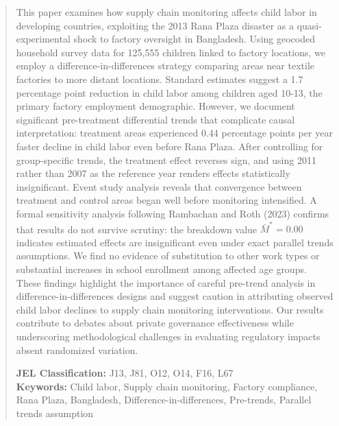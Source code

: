 
\begin{abstract}
\noindent This paper examines how supply chain monitoring affects child labor in developing countries, exploiting the 2013 Rana Plaza disaster as a quasi-experimental shock to factory oversight in Bangladesh. Using geocoded household survey data for 125,555 children linked to factory locations, we employ a difference-in-differences strategy comparing areas near textile factories to more distant locations. Standard estimates suggest a 1.7 percentage point reduction in child labor among children aged 10-13, the primary factory employment demographic. However, we document significant pre-treatment differential trends that complicate causal interpretation: treatment areas experienced 0.44 percentage points per year faster decline in child labor even before Rana Plaza. After controlling for group-specific trends, the treatment effect reverses sign, and using 2011 rather than 2007 as the reference year renders effects statistically insignificant. Event study analysis reveals that convergence between treatment and control areas began well before monitoring intensified. A formal sensitivity analysis following Rambachan and Roth (2023) confirms that results do not survive scrutiny: the breakdown value $\bar{M}^* = 0.00$ indicates estimated effects are insignificant even under exact parallel trends assumptions. We find no evidence of substitution to other work types or substantial increases in school enrollment among affected age groups. These findings highlight the importance of careful pre-trend analysis in difference-in-differences designs and suggest caution in attributing observed child labor declines to supply chain monitoring interventions. Our results contribute to debates about private governance effectiveness while underscoring methodological challenges in evaluating regulatory impacts absent randomized variation.

\vspace{0.5cm}
\noindent \textbf{JEL Classification:} J13, J81, O12, O14, F16, L67\\
\textbf{Keywords:} Child labor, Supply chain monitoring, Factory compliance, Rana Plaza, Bangladesh, Difference-in-differences, Pre-trends, Parallel trends assumption
\end{abstract}

